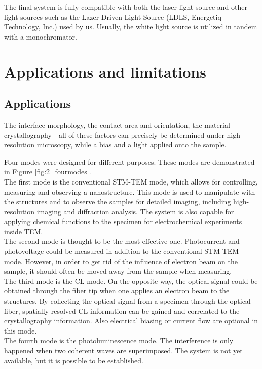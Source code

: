 The final system is fully compatible with both the laser light source and other light sources such as the Lazer-Driven Light Source (LDLS, Energetiq Technology, Inc.) used by us. Usually, the white light source is utilized in tandem with a monochromator. 

\section{Applications and limitations}
\subsection{Applications}
 The interface morphology, the contact area and orientation, the material crystallography - all of these factors can precisely be determined under high resolution microscopy, while a bias and a light applied onto the sample. 

Four modes were designed for different purposes. These modes are demonstrated in Figure \ref{fig:2_fourmodes}.\\

The first mode is the conventional STM-TEM mode, which allows for controlling, measuring and observing a nanostructure. This mode is used to manipulate with the structures and to observe the samples for detailed imaging, including high-resolution imaging and diffraction analysis. 
The system is also capable for applying chemical functions to the specimen for electrochemical experiments inside TEM. \\

The second mode is thought to be the most effective one. Photocurrent and photovoltage could be measured in addition to the conventional STM-TEM mode.
However, in order to get rid of the influence of electron beam on the sample, it should often be moved away from the sample when measuring.\\

The third mode is the CL mode. On the opposite way, the optical signal could be obtained through the fiber tip when one applies an electron beam to the structures. By collecting the optical signal from a specimen through the optical fiber, spatially resolved CL information can be gained and correlated to the crystallography information. Also electrical biasing or current flow are optional in this mode. \\

The fourth mode is the photoluminescence mode. The interference is only happened when two coherent waves are superimposed. The system is not yet available, but it is possible to be established. 

